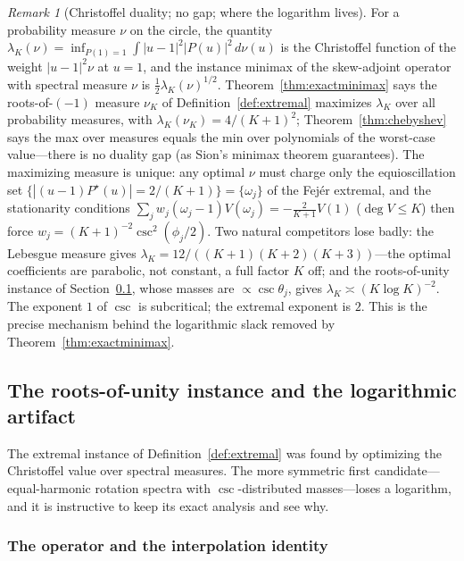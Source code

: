 \documentclass[11pt]{article}
\theoremstyle{definition}
\theoremstyle{remark}
\newtheorem{remark}[theorem]{Remark}
\newcommand{\abs}[1]{| #1 |}
\begin{document}
\begin{remark}[Christoffel duality; no gap; where the logarithm
lives]\label{rem:christoffel}
For a probability measure $\nu$ on the circle, the quantity
$\lambda_K(\nu)=\inf_{P(1)=1}\int\abs{u-1}^2\abs{P(u)}^2\,d\nu(u)$ is the
Christoffel function of the weight $\abs{u-1}^2\nu$ at $u=1$, and the
instance minimax of the skew-adjoint operator with spectral measure $\nu$
is $\frac12\lambda_K(\nu)^{1/2}$. Theorem~\ref{thm:exactminimax} says the
roots-of-$(-1)$ measure $\nu_K$ of Definition~\ref{def:extremal} maximizes
$\lambda_K$ over all probability measures, with
$\lambda_K(\nu_K)=4/(K+1)^2$; Theorem~\ref{thm:chebyshev} says the max
over measures equals the min over polynomials of the worst-case
value---there is no duality gap (as Sion's minimax theorem guarantees).
The maximizing measure is unique: any optimal $\nu$ must charge only the
equioscillation set $\{\abs{(u-1)P^\star(u)}=2/(K+1)\}=\{\omega_j\}$ of the
Fej\'er extremal, and the stationarity conditions
$\sum_jw_j(\omega_j-1)V(\omega_j)=-\frac2{K+1}V(1)$ ($\deg V\le K$) then
force $w_j=(K+1)^{-2}\csc^2(\phi_j/2)$. Two natural competitors lose
badly: the Lebesgue measure gives
$\lambda_K=12/((K+1)(K+2)(K+3))$---the optimal coefficients are parabolic,
not constant, a full factor $K$ off; and the roots-of-unity instance of
Section~\ref{sec:rotation}, whose masses are $\propto\csc\theta_j$, gives
$\lambda_K\asymp(K\log K)^{-2}$. The exponent $1$ of $\csc$ is
subcritical; the extremal exponent is $2$. This is the precise mechanism
behind the logarithmic slack removed by Theorem~\ref{thm:exactminimax}.
\end{remark}

\subsection{The roots-of-unity instance and the logarithmic
artifact}\label{sec:rotation}

The extremal instance of Definition~\ref{def:extremal} was found by
optimizing the Christoffel value over spectral measures. The more
symmetric first candidate---equal-harmonic rotation spectra with
$\csc$-distributed masses---loses a logarithm, and it is instructive to
keep its exact analysis and see why.

\subsubsection{The operator and the interpolation identity}
\end{document}
